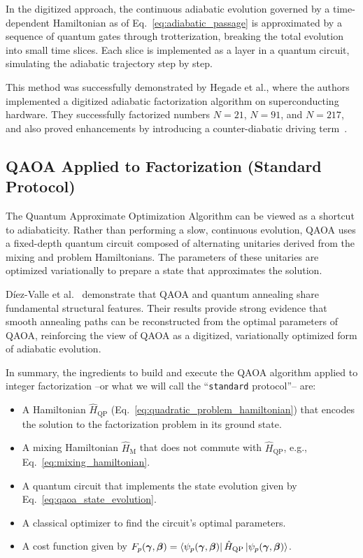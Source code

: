 In the digitized approach, the continuous adiabatic evolution governed by a time-dependent Hamiltonian as of Eq.~\ref{eq:adiabatic_passage} is approximated by a sequence of quantum gates through trotterization, breaking the total evolution into small time slices. Each slice is implemented as a layer in a quantum circuit, simulating the adiabatic trajectory step by step.

This method was successfully demonstrated by Hegade et al., where the authors implemented a digitized adiabatic factorization algorithm on superconducting hardware. They successfully factorized numbers $N=21$, $N=91$, and $N=217$, and also proved enhancements by introducing a counter-diabatic driving term~\cite{hegade_digitized_2021}.

\subsection{QAOA Applied to Factorization (Standard Protocol)}
The Quantum Approximate Optimization Algorithm can be viewed as a shortcut to adiabaticity. Rather than performing a slow, continuous evolution, QAOA uses a fixed-depth quantum circuit composed of alternating unitaries derived from the mixing and problem Hamiltonians. The parameters of these unitaries are optimized variationally to prepare a state that approximates the solution.

Díez-Valle et al.~\cite{diez-valle_universal_2025} demonstrate that QAOA and quantum annealing share fundamental structural features. Their results provide strong evidence that smooth annealing paths can be reconstructed from the optimal parameters of QAOA, reinforcing the view of QAOA as a digitized, variationally optimized form of adiabatic evolution.

In summary, the ingredients to build and execute the QAOA algorithm applied to integer factorization --or what we will call the ``\texttt{standard} protocol''-- are:
\begin{itemize}
    \item A Hamiltonian $\hat{H}_\mathrm{QP}$ (Eq.~\ref{eq:quadratic_problem_hamiltonian}) that encodes the solution to the factorization problem in its ground state.
    \item A mixing Hamiltonian $\hat{H}_\mathrm{M}$ that does not commute with $\hat{H}_\mathrm{QP}$, e.g., Eq.~\ref{eq:mixing_hamiltonian}.
    \item A quantum circuit that implements the state evolution given by Eq.~\ref{eq:qaoa_state_evolution}.
    \item A classical optimizer to find the circuit's optimal parameters.
    \item A cost function given by $F_p (\bm{\gamma}, \bm{\beta}) = \bra{\psi_p (\bm{\gamma}, \bm{\beta})} \hat{H}_\mathrm{QP} \ket{\psi_p (\bm{\gamma}, \bm{\beta})}$.
\end{itemize}

